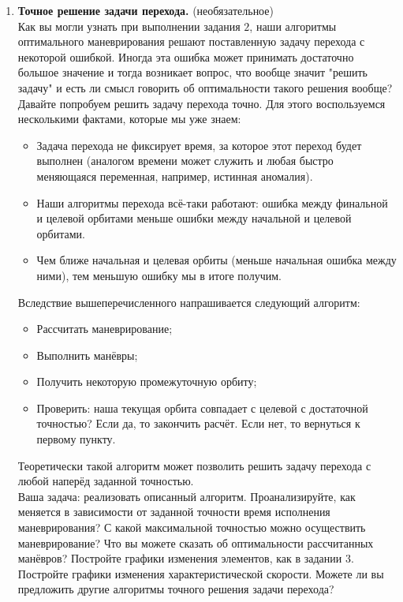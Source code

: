 \documentclass[12pt]{article}
\begin{document}
\begin{enumerate}
  \item[\textbf{\arabic{enumi}$^\ast$}.] \textbf{Точное решение задачи перехода.} (необязательное) \\
  Как вы могли узнать при выполнении задания $2$, наши алгоритмы оптимального маневрирования решают поставленную задачу перехода с некоторой ошибкой. Иногда эта ошибка может принимать достаточно большое значение и тогда возникает вопрос, что вообще значит "решить задачу" и есть ли смысл говорить об оптимальности такого решения вообще? \\
  Давайте попробуем решить задачу перехода точно. Для этого воспользуемся несколькими фактами, которые мы уже знаем: 
  \begin{itemize}
      \item Задача перехода не фиксирует время, за которое этот переход будет выполнен (аналогом времени может служить и любая быстро меняющаяся переменная, например, истинная аномалия).
      \item Наши алгоритмы перехода всё-таки работают: ошибка между финальной и целевой орбитами меньше ошибки между начальной и целевой орбитами.
      \item Чем ближе начальная и целевая орбиты (меньше начальная ошибка между ними), тем меньшую ошибку мы в итоге получим.
  \end{itemize}
  Вследствие вышеперечисленного напрашивается следующий алгоритм:
  \begin{itemize}
      \item Рассчитать маневрирование;
      \item Выполнить манёвры;
      \item Получить некоторую промежуточную орбиту;
      \item Проверить: наша текущая орбита совпадает с целевой с достаточной точностью? Если да, то закончить расчёт. Если нет, то вернуться к первому пункту.
  \end{itemize}
  Теоретически такой алгоритм может позволить решить задачу перехода с любой наперёд заданной точностью. \\ 
  Ваша задача: реализовать описанный алгоритм. Проанализируйте, как меняется в зависимости от заданной точности время исполнения маневрирования? С какой максимальной точностью можно осуществить маневрирование? Что вы можете сказать об оптимальности рассчитанных манёвров? Постройте графики изменения элементов, как в задании $3$. Постройте графики изменения характеристической скорости. Можете ли вы предложить другие алгоритмы точного решения задачи перехода?


\end{enumerate}
\end{document}
